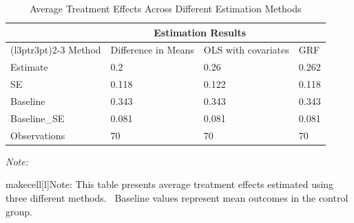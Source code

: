 \begin{table}
\centering
\caption{\label{tab:tab:ate_results}Average Treatment Effects Across Different Estimation Methods}
\centering
\begin{threeparttable}
\begin{tabular}[t]{llll}
\toprule
\multicolumn{1}{c}{ } & \multicolumn{2}{c}{Estimation Results} \\
\cmidrule(l{3pt}r{3pt}){2-3}
Method & Difference in Means & OLS with covariates & GRF\\
Estimate & 0.2 & 0.26 & 0.262\\
SE & 0.118 & 0.122 & 0.118\\
Baseline & 0.343 & 0.343 & 0.343\\
Baseline\_SE & 0.081 & 0.081 & 0.081\\
\addlinespace
Observations & 70 & 70 & 70\\
\bottomrule
\end{tabular}
\begin{tablenotes}[para]
\item \textit{Note: } 
\item makecell[l]{Note: This table presents average treatment effects estimated using three different methods. \           Baseline values represent mean outcomes in the control group.}
\end{tablenotes}
\end{threeparttable}
\end{table}